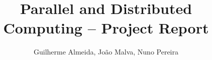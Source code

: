 \documentclass[11pt,a4paper]{report}
\begin{document}
\title{Parallel and Distributed Computing --  Project Report}
\author{Guilherme Almeida, João Malva, Nuno Pereira}






\begin{Prolog}
  \tableofcontents
  \cleardoublepage
\end{Prolog}


\StartBody

 



\end{document}
